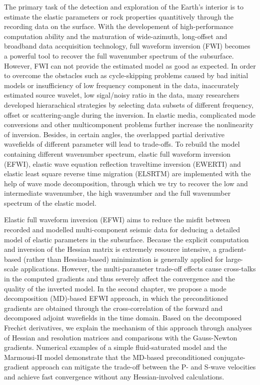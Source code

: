 \begin{eabstract}
	The primary task of the detection and exploration of the Earth's interior is to estimate the elastic parameters or rock properties
	quantitively
	through the recording data on the surface. With the developement of 
	high-performance computation ability and the
	maturation of wide-azimuth, long-offset and broadband data accquisition 
	technology, full waveform inversion (FWI) becomes a powerful tool to recover the full
	 wavenumber spectrum of the subsurface. However, FWI can not provide the estimated
	model as good as expected. In order to overcome the obstacles such as cycle-skipping problems
	caused by bad initial models or
	insufficiency of low frequency component in the data, inaccurately estimated source
	wavelet, low sigal/noisy ratio in the data, many researchers developed hierarachical strategies
	by selecting data subsets of different frequency, offset or scattering-angle during the
	inversion.	
	In elastic media, complicated mode conversions and other multicomponent problems further increase the
	nonlinearity of inversion. Besides, in certain angles, the overlapped partial derivative wavefields of  different
	parameter will lead to trade-offs.
	To rebuild the model containing different wavenumber spectrum, elastic full waveform
	inversion (EFWI), elastic wave equation 
	reflection traveltime inversion (EWERTI) and elastic least square reverse time
	migration (ELSRTM) are implemented with the help of wave mode decomposition, through which we
	try to recover the low and intermediate wavenumber, 
	the high wavenumber and the full wavenumber spectrum of the elastic model.

Elastic full waveform inversion (EFWI) aims to reduce the misfit between recorded and modelled multi-component
seismic data for deducing a detailed model of elastic parameters in the subsurface.
Because the explicit computation and inversion of the Hessian matrix
is extremely resource intensive,
a gradient-based (rather than Hessian-based) minimization is generally applied for large-scale applications.
However, the multi-parameter trade-off effects cause cross-talks in the computed gradients and
thus severely affect the convergence and the quality of the inverted model.
In the second chapter, we propose a mode decomposition (MD)-based EFWI approach, in which the preconditioned gradients
are obtained through the cross-correlation of the forward and
decomposed adjoint wavefields in the time domain.
Based on the decomposed Frech{$\acute{e}$}t derivatives,
we explain the mechanism of this approach through analyses of Hessian and resolution matrices
and comparisons with the Gauss-Newton gradients.
Numerical examples of a simple fluid-saturated model and the Marmousi-II model
demonstrate that the MD-based preconditioned conjugate-gradient approach
can mitigate the trade-off between the P- and S-wave velocities and achieve fast
convergence without any Hessian-involved calculations.


\end{eabstract}
